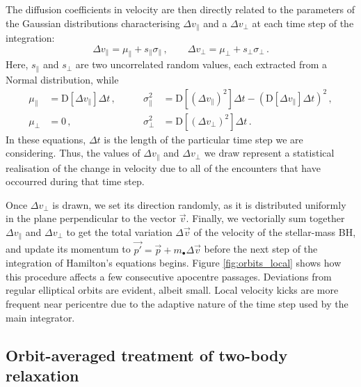 \documentclass[desactivate]{aa}
\begin{document}
        The diffusion coefficients in velocity are then directly related to the parameters of the Gaussian distributions characterising $\Delta v_\parallel$ and a $\Delta v_\perp$ at each time step of the integration: 
        \begin{equation}
            \Delta v_\parallel = \mu_\parallel + s_\parallel \sigma_\parallel \, , \qquad \Delta v_\perp = \mu_\perp + s_\perp \sigma_\perp \, .        
        \end{equation}
        Here, $s_\parallel$ and $s_\perp$ are two uncorrelated random values, each extracted from a Normal distribution, while
        \begin{equation}
            \begin{alignedat}{2}
                \mu_\parallel &= \mathrm{D}\left[\Delta v_\parallel\right] \Delta t \, , &\qquad \sigma^2_\parallel &= \mathrm{D}\left[\left(\Delta v_\parallel\right)^2\right] \Delta t - \left(\mathrm{D}\left[\Delta v_\parallel\right] \Delta t \right)^2 \, , \\
                \mu_\perp &= 0 \, , &\qquad \sigma^2_\perp &= \mathrm{D}\left[\left(\Delta v_\perp\right)^2\right] \Delta t \, .
            \end{alignedat}
        \end{equation}
        In these equations, $\Delta t$ is the length of the particular time step we are considering. Thus, the values of $\Delta v_\parallel$ and $\Delta v_\perp$ we draw represent a statistical realisation of the change in velocity due to all of the encounters that have occourred during that time step.
    
        Once $\Delta v_\perp$ is drawn, we set its direction randomly, as it is distributed uniformly in the plane perpendicular to the vector $\vec{v}$. Finally, we vectorially sum together $\Delta v_\parallel$ and $\Delta v_\perp$ to get the total variation $\Delta \vec{v}$ of the velocity of the stellar-mass BH, and update its momentum to $\vec{p'} = \vec{p} + m_\bullet \Delta \vec{v}$ before the next step of the integration of Hamilton's equations begins. Figure \ref{fig:orbits_local} shows how this procedure affects a few consecutive apocentre passages. Deviations from regular elliptical orbits are evident, albeit small. Local velocity kicks are more frequent near pericentre due to the adaptive nature of the time step used by the main integrator. 
    
    \subsection{Orbit-averaged treatment of two-body relaxation} \label{sec:OA}
\end{document}
